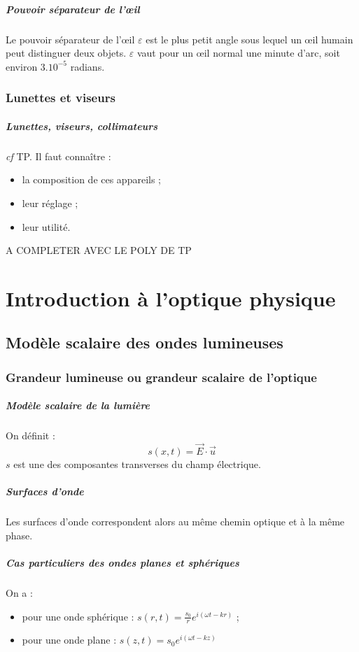 \documentclass[french]{book}
\theoremstyle{plain}
\theoremstyle{definition}
\theoremstyle{remark}
\begin{document}
\paragraph{Pouvoir séparateur de l'œil} Le pouvoir séparateur de l'œil $\varepsilon$ est le plus petit angle sous lequel un œil humain peut distinguer deux objets. $\varepsilon$ vaut pour un œil normal une minute d'arc, soit environ $3.10^{-5}$ radians.
\subsection{Lunettes et viseurs}
\paragraph{Lunettes, viseurs, collimateurs}
\textit{cf} TP. Il faut connaître :
\begin{itemize}
	\item la composition de ces appareils ;
	\item leur réglage ;
	\item leur utilité.
\end{itemize}
A COMPLETER AVEC LE POLY DE TP

\chapter{Introduction à l'optique physique}
\localtableofcontents
\section{Modèle scalaire des ondes lumineuses}
\subsection{Grandeur lumineuse ou grandeur scalaire de l'optique}
\paragraph{Modèle scalaire de la lumière} On définit : $$s(x,t)=\overrightarrow{E}\cdot\overrightarrow{u}$$ $s$ est une des composantes transverses du champ électrique.
\paragraph{Surfaces d'onde}Les surfaces d'onde correspondent alors au même chemin optique et à la même phase.
\paragraph{Cas particuliers des ondes planes et sphériques}On a :
\begin{itemize}
	\item pour une onde sphérique : $s(r,t)=\displaystyle \frac{s_0}{r}e^{i(\omega t-kr)}$ ;
	\item pour une onde plane : $s(z,t)=s_0\displaystyle e^{i(\omega t-kz)}$
\end{itemize}
\end{document}
